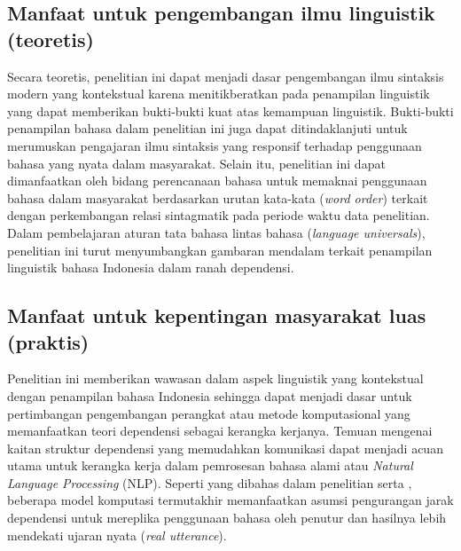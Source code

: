 \subsection{Manfaat untuk pengembangan ilmu linguistik (teoretis)}
Secara teoretis, penelitian ini dapat menjadi dasar pengembangan ilmu sintaksis modern yang kontekstual karena menitikberatkan pada penampilan linguistik yang dapat memberikan bukti-bukti kuat atas kemampuan linguistik. Bukti-bukti penampilan bahasa dalam penelitian ini juga dapat ditindaklanjuti untuk merumuskan pengajaran ilmu sintaksis yang responsif terhadap penggunaan bahasa yang nyata dalam masyarakat. Selain itu, penelitian ini dapat dimanfaatkan oleh bidang perencanaan bahasa untuk memaknai penggunaan bahasa dalam masyarakat berdasarkan urutan kata-kata (\textit{word order}) terkait dengan perkembangan relasi sintagmatik pada periode waktu data penelitian. Dalam pembelajaran aturan tata bahasa lintas bahasa (\textit{language universals}), penelitian ini turut menyumbangkan gambaran mendalam terkait penampilan linguistik bahasa Indonesia dalam ranah dependensi.

\subsection{Manfaat untuk kepentingan masyarakat luas (praktis)}
Penelitian ini memberikan wawasan dalam aspek linguistik yang kontekstual dengan penampilan bahasa Indonesia sehingga dapat menjadi dasar untuk pertimbangan pengembangan perangkat atau metode komputasional yang memanfaatkan teori dependensi sebagai kerangka kerjanya. Temuan mengenai kaitan struktur dependensi yang memudahkan komunikasi dapat menjadi acuan utama untuk kerangka kerja dalam pemrosesan bahasa alami atau \textit{Natural Language Processing} (NLP). Seperti yang dibahas dalam penelitian \cite{klein2004corpus} serta \cite{smith2006minimum}, beberapa model komputasi termutakhir memanfaatkan asumsi pengurangan jarak dependensi untuk mereplika penggunaan bahasa oleh penutur dan hasilnya lebih mendekati ujaran nyata (\textit{real utterance}).

